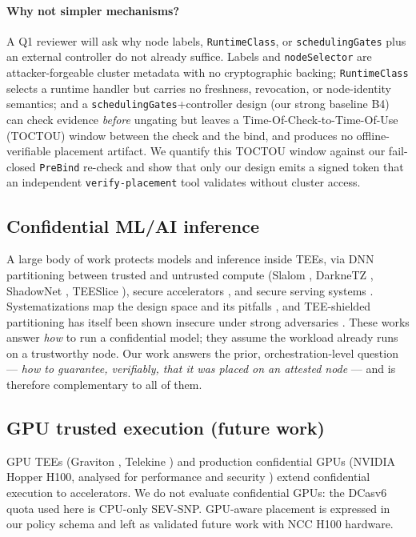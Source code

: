 \paragraph{Why not simpler mechanisms?}
A Q1 reviewer will ask why node labels, \texttt{RuntimeClass}, or
\texttt{schedulingGates} plus an external controller do not already suffice.
Labels and \texttt{nodeSelector} are attacker-forgeable cluster metadata with no
cryptographic backing; \texttt{RuntimeClass} selects a runtime handler but
carries no freshness, revocation, or node-identity semantics; and a
\texttt{schedulingGates}+controller design (our strong baseline B4) can check
evidence \emph{before} ungating but leaves a Time-Of-Check-to-Time-Of-Use
(TOCTOU) window between the check and the bind, and produces no offline-verifiable
placement artifact. We quantify this TOCTOU window against our fail-closed
\texttt{PreBind} re-check and show that only our design emits a signed token that
an independent \texttt{verify-placement} tool validates without cluster access.

\subsection{Confidential ML/AI inference}
A large body of work protects models and inference inside TEEs, via DNN
partitioning between trusted and untrusted compute (Slalom \cite{tramer2019slalom},
DarkneTZ \cite{mo2020darknetz}, ShadowNet \cite{sun2020shadownet},
TEESlice \cite{li2024teeslice}), secure accelerators
\cite{hua2020guardnn,hashemi2022darknight}, and secure serving systems
\cite{ma2020s3ml,lee2020ppml,hu2024sesemi,schambach2026enclavex,yu2025dualprivacy,abdollahi2025ondevice,abdollahi2026agentee}.
Systematizations map the design space and its pitfalls
\cite{mo2022mlccsok,duy2021cmlsok}, and TEE-shielded partitioning has itself been
shown insecure under strong adversaries \cite{zhang2023noprivacy}. These works
answer \emph{how} to run a confidential model; they assume the workload already
runs on a trustworthy node. Our work answers the prior, orchestration-level
question --- \emph{how to guarantee, verifiably, that it was placed on an
attested node} --- and is therefore complementary to all of them.

\subsection{GPU trusted execution (future work)}
GPU TEEs (Graviton \cite{volos2018graviton}, Telekine \cite{hunt2020telekine})
and production confidential GPUs (NVIDIA Hopper H100, analysed for performance
\cite{zhu2024h100bench} and security \cite{gu2025gpucc}) extend confidential
execution to accelerators. We do not evaluate confidential GPUs: the DCasv6
quota used here is CPU-only SEV-SNP. GPU-aware placement is expressed in our
policy schema and left as validated future work with NCC H100 hardware.

